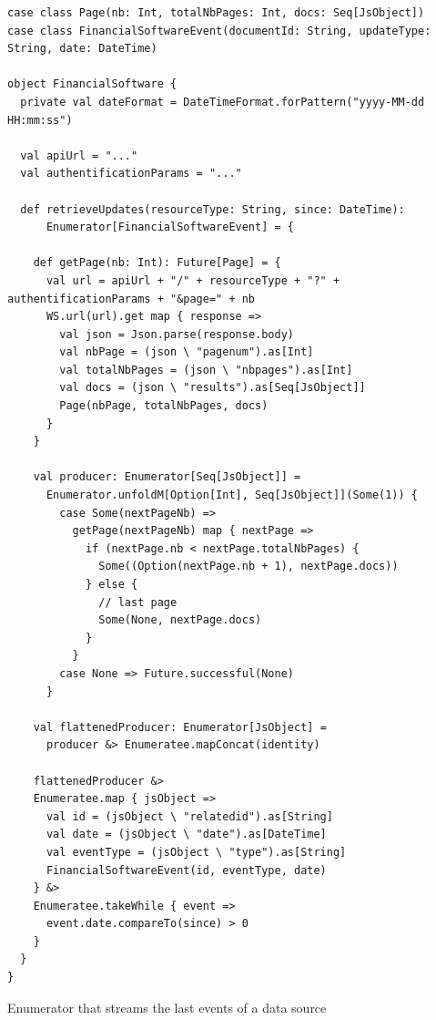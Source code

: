 \begin{listing}
\begin{verbatim}
case class Page(nb: Int, totalNbPages: Int, docs: Seq[JsObject])
case class FinancialSoftwareEvent(documentId: String, updateType: String, date: DateTime)

object FinancialSoftware {
  private val dateFormat = DateTimeFormat.forPattern("yyyy-MM-dd HH:mm:ss")

  val apiUrl = "..."
  val authentificationParams = "..."

  def retrieveUpdates(resourceType: String, since: DateTime): 
      Enumerator[FinancialSoftwareEvent] = {

    def getPage(nb: Int): Future[Page] = {
      val url = apiUrl + "/" + resourceType + "?" + authentificationParams + "&page=" + nb
      WS.url(url).get map { response =>
        val json = Json.parse(response.body)
        val nbPage = (json \ "pagenum").as[Int]
        val totalNbPages = (json \ "nbpages").as[Int]
        val docs = (json \ "results").as[Seq[JsObject]]
        Page(nbPage, totalNbPages, docs)
      }
    }

    val producer: Enumerator[Seq[JsObject]] = 
      Enumerator.unfoldM[Option[Int], Seq[JsObject]](Some(1)) {
        case Some(nextPageNb) =>
          getPage(nextPageNb) map { nextPage =>
            if (nextPage.nb < nextPage.totalNbPages) {
              Some((Option(nextPage.nb + 1), nextPage.docs))
            } else {
              // last page
              Some(None, nextPage.docs)
            }
          }
        case None => Future.successful(None)
      }

    val flattenedProducer: Enumerator[JsObject] = 
      producer &> Enumeratee.mapConcat(identity)

    flattenedProducer &>
    Enumeratee.map { jsObject =>
      val id = (jsObject \ "relatedid").as[String]
      val date = (jsObject \ "date").as[DateTime]
      val eventType = (jsObject \ "type").as[String]
      FinancialSoftwareEvent(id, eventType, date)
    } &>
    Enumeratee.takeWhile { event =>
      event.date.compareTo(since) > 0
    }
  }
}
\end{verbatim}
\caption{Enumerator that streams the last events of a data source}
\label{lst:enumfetchsellsy}
\end{listing}

